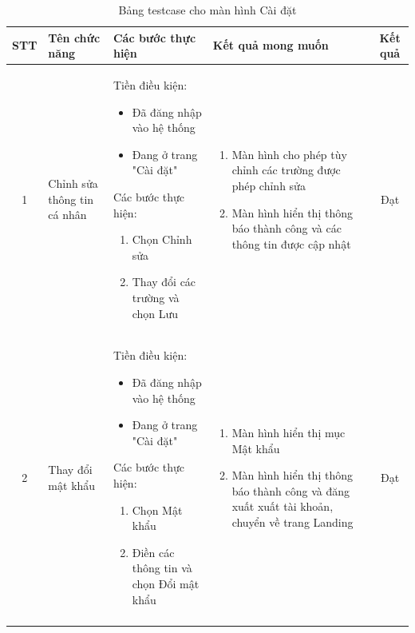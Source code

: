 \newpage
\begin{longtable}{|c|m{2.5cm}|m{5.5cm}|m{4.5cm}|c|}
    \hline
    \textbf{STT} & \textbf{Tên chức năng} & \textbf{Các bước thực hiện} & \textbf{Kết quả mong muốn} & \textbf{Kết quả} \\
    \hline
    1 & 
    Chỉnh sửa thông tin cá nhân & 
    Tiền điều kiện:
    \begin{itemize}
        \item Đã đăng nhập vào hệ thống
        \item Đang ở trang "Cài đặt"
    \end{itemize}
    Các bước thực hiện: 
    \begin{enumerate}[label=\arabic*.]
        \item Chọn Chỉnh sửa
        \item Thay đổi các trường và chọn Lưu
    \end{enumerate}
    & 
    \begin{enumerate}[label=\arabic*.]
        \item Màn hình cho phép tùy chỉnh các trường được phép chỉnh sửa
        \item Màn hình hiển thị thông báo thành công và các thông tin được cập nhật
    \end{enumerate}  & Đạt \\
    \hline
    2 & 
    Thay đổi mật khẩu & 
    Tiền điều kiện:
    \begin{itemize}
        \item Đã đăng nhập vào hệ thống
        \item Đang ở trang "Cài đặt"
    \end{itemize}
    Các bước thực hiện: 
    \begin{enumerate}[label=\arabic*.]
        \item Chọn Mật khẩu
        \item Điền các thông tin và chọn Đổi mật khẩu
    \end{enumerate}
    & 
    \begin{enumerate}[label=\arabic*.]
        \item Màn hình hiển thị mục Mật khẩu
        \item Màn hình hiển thị thông báo thành công và đăng xuất xuất tài khoản, chuyển về trang Landing
    \end{enumerate}  & Đạt \\
    \hline
    \caption{Bảng testcase cho màn hình Cài đặt}
\end{longtable}